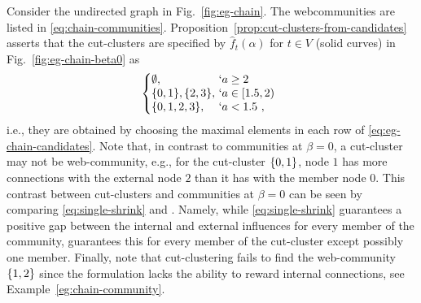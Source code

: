 \begin{example}
	\label{eg:chain-cut}
	Consider the undirected graph in Fig.~\ref{fig:eg-chain}.
	The webcommunities are listed in \eqref{eq:chain-communities}.
%
	Proposition~\ref{prop:cut-clusters-from-candidates} asserts that the cut-clusters are specified
	by $\hat{f}_{t}(\alpha)$ for $t\in V$ (solid curves) in Fig.~\ref{fig:eg-chain-beta0} as
	\begin{align}
			\label{eq:eg-chain-cut}
			\left\{
				\!\!\!
				\begin{array}{l@{\ }l}
					\emptyset, & `a \geq 2  
					\\
					\Set{0,1}, \Set{2,3}, & `a \in [1.5, 2)
					\\
					\Set{0,1,2,3}, &  `a < 1.5 \ ,
				\end{array}
			\right.
	\end{align}
	i.e., they are obtained by choosing the maximal elements in each row of \eqref{eq:eg-chain-candidates}.
	Note that, in contrast to communities at $\beta = 0$, a cut-cluster may 
	not be web-community, e.g., for the cut-cluster $\{0,1\}$, node $1$  has more
	connections with the external node $2$ than it has with the member node $0$.
	This contrast between cut-clusters and communities at $\beta = 0$
	can be seen by comparing \eqref{eq:single-shrink} and \cite[Lemma~3.1]{flake:cut-clustering}.
	Namely, while \eqref{eq:single-shrink} guarantees a positive gap between the internal and external
	influences for every member of the community, \cite[Lemma~3.1]{flake:cut-clustering} guarantees this
	for every member of the cut-cluster except possibly one member. 
	Finally, note that cut-clustering fails to find the web-community $\{1,2\}$ since the formulation
	lacks the ability to reward internal connections, see Example~\ref{eg:chain-community}.
\end{example}

